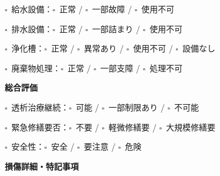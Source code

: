 \documentclass[a4paper,12pt]{jarticle}
\newcommand{\checkbox}{$\square$\ }
\newcommand{\underlinespace}[1]{\underline{\hspace{#1}}}
\begin{document}
\noindent
\checkbox 給水設備：\quad \checkbox 正常 \quad / \quad \checkbox 一部故障 \quad / \quad \checkbox 使用不可

\vspace{2mm}

\noindent
\checkbox 排水設備：\quad \checkbox 正常 \quad / \quad \checkbox 一部詰まり \quad / \quad \checkbox 使用不可

\vspace{2mm}

\noindent
\checkbox 浄化槽：\quad \checkbox 正常 \quad / \quad \checkbox 異常あり \quad / \quad \checkbox 使用不可 \quad / \quad \checkbox 設備なし

\vspace{2mm}

\noindent
\checkbox 廃棄物処理：\quad \checkbox 正常 \quad / \quad \checkbox 一部支障 \quad / \quad \checkbox 処理不可

\vspace{8mm}

\begin{center}
\textbf{\large 総合評価}
\end{center}

\vspace{3mm}

\noindent
\checkbox 透析治療継続：\quad \checkbox 可能 \quad / \quad \checkbox 一部制限あり \quad / \quad \checkbox 不可能

\vspace{2mm}

\noindent
\checkbox 緊急修繕要否：\quad \checkbox 不要 \quad / \quad \checkbox 軽微修繕要 \quad / \quad \checkbox 大規模修繕要

\vspace{2mm}

\noindent
\checkbox 安全性：\quad \checkbox 安全 \quad / \quad \checkbox 要注意 \quad / \quad \checkbox 危険

\vspace{8mm}

\begin{center}
\textbf{\large 損傷詳細・特記事項}
\end{center}

\vspace{3mm}

\noindent
\underlinespace{13cm}

\vspace{3mm}

\noindent
\underlinespace{13cm}

\vspace{3mm}

\noindent
\underlinespace{13cm}

\vspace{3mm}

\noindent
\underlinespace{13cm}

\vspace{3mm}

\noindent
\underlinespace{13cm}
\end{document}
